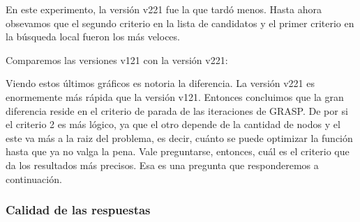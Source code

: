En este experimento, la versión v221 fue la que tardó menos.
Hasta ahora obsevamos que el segundo criterio en la lista de candidatos y el primer criterio en la búsqueda local fueron los más veloces.

\medskip

Comparemos las versiones v121 con la versión v221:

\begin{center}



\end{center}

Viendo estos últimos gráficos es notoria la diferencia. La versión v221 es enormemente más rápida que la versión v121.
Entonces concluimos que la gran diferencia reside en el criterio de parada de las iteraciones de GRASP.
De por si el criterio 2 es más lógico, ya que el otro depende de la cantidad de nodos y el este va más a la raiz del problema, es decir, cuánto se puede optimizar la función hasta que ya no valga la pena.
Vale preguntarse, entonces, cuál es el criterio que da los resultados más precisos.
Esa es una pregunta que responderemos a continuación.

\subsubsection{Calidad de las respuestas}


